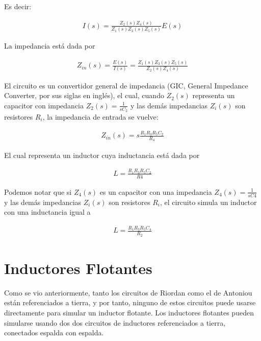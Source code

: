 \documentclass{article}
\begin{document}
Es decir:

\begin{align}
	I(s) = \frac{Z_2(s)Z_4(s)}{Z_1(s)Z_3(s)Z_5(s)}E(s)
\end{align}

La impedancia está dada por

\begin{align}
	Z_{in}(s) = \frac{E(s)}{I(s)} = \frac{Z_1(s)Z_3(s)Z_5(s)}{Z_2(s)Z_4(s)}
\end{align}

El circuito es un convertidor general de impedancia (GIC, General Impedance Converter, por sus siglas en inglés), el cual, cuando $Z_2(s)$ representa un capacitor con impedancia $Z_2(s) = \frac{1}{sC_2}$ y las demás impedancias $Z_i(s)$ son resistores $R_i$, la impedancia de entrada se vuelve:

\begin{align}
	Z_{in}(s) = s\frac{R_1R_3R_5C_2}{R_4}
\end{align}

El cual representa un inductor cuya inductancia está dada por

\begin{align}
	L = \frac{R_1R_3R_5C_2}{R4}
\end{align}

Podemos notar que si $Z_4(s)$ es un capacitor con una impedancia $Z_4(s) = \frac{1}{sC4}$ y las demás impedancias $Z_i(s)$ son resistores $R_i$, el circuito simula un inductor con una inductancia igual a

\begin{align}
	L = \frac{R_1R_3R_5C_4}{R_2}
\end{align}

\section{Inductores Flotantes}
Como se vio anteriormente, tanto los circuitos de Riordan como el de Antoniou están referenciados a tierra, y por tanto, ninguno de estos circuitos puede usarse directamente para simular un inductor flotante. Los inductores flotantes pueden simularse usando dos dos circuitos de inductores referenciados a tierra, conectados espalda con espalda.
\end{document}
